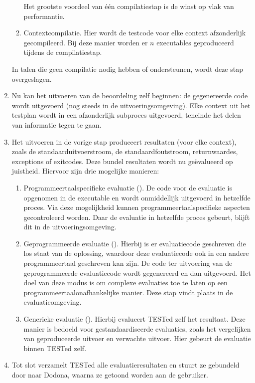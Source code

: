 \begin{enumerate}
\begin{enumerate}
        Het grootste voordeel van één compilatiestap is de winst op vlak van performantie.
        \item Contextcompilatie.
        Hier wordt de testcode voor elke context afzonderlijk gecompileerd.
        Bij deze manier worden er $n$ executables geproduceerd tijdens de compilatiestap.
    \end{enumerate}
    In talen die geen compilatie nodig hebben of ondersteunen, wordt deze stap overgeslagen.
    \item Nu kan het uitvoeren van de beoordeling zelf beginnen: de gegenereerde code wordt uitgevoerd (nog steeds in de uitvoeringsomgeving).
    Elke context uit het testplan wordt in een afzonderlijk subproces uitgevoerd, teneinde het delen van informatie tegen te gaan.
    \item Het uitvoeren in de vorige stap produceert resultaten (voor elke context), zoals de standaarduitvoerstroom, de standaardfoutstroom, returnwaardes, exceptions of exitcodes.
    Deze bundel resultaten wordt nu geëvalueerd op juistheid.
    Hiervoor zijn drie mogelijke manieren:
    \begin{enumerate}
        \item Programmeertaalspecifieke evaluatie ().
        De code voor de evaluatie is opgenomen in de executable en wordt onmiddellijk uitgevoerd in hetzelfde proces.
        Via deze mogelijkheid kunnen programmeertaalspecifieke aspecten gecontroleerd worden.
        Daar de evaluatie in hetzelfde proces gebeurt, blijft dit in de uitvoeringsomgeving.
        \item Geprogrammeerde evaluatie ().
        Hierbij is er evaluatiecode geschreven die los staat van de oplossing, waardoor deze evaluatiecode ook in een andere programmeertaal geschreven kan zijn.
        De code ter uitvoering van de geprogrammeerde evaluatiecode wordt gegenereerd en dan uitgevoerd.
        Het doel van deze modus is om complexe evaluaties toe te laten op een programmeertaalonafhankelijke manier.
        Deze stap vindt plaats in de evaluatieomgeving.
        \item Generieke evaluatie ().
        Hierbij evalueert TESTed zelf het resultaat.
        Deze manier is bedoeld voor gestandaardiseerde evaluaties, zoals het vergelijken van geproduceerde uitvoer en verwachte uitvoer.
        Hier gebeurt de evaluatie binnen TESTed zelf.
    \end{enumerate}
    \item Tot slot verzamelt TESTed alle evaluatieresultaten en stuurt ze gebundeld door naar Dodona, waarna ze getoond worden aan de gebruiker.
\end{enumerate}

